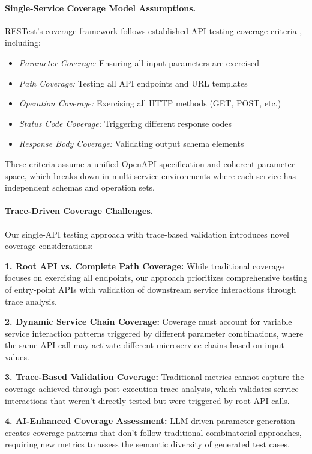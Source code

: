 \documentclass[conference]{IEEEtran}
\begin{document}
\paragraph{Single-Service Coverage Model Assumptions.}
RESTest's coverage framework follows established API testing coverage criteria \cite{martin2019restest}, including:
\begin{itemize}[leftmargin=*]
    \item \textit{Parameter Coverage:} Ensuring all input parameters are exercised
    \item \textit{Path Coverage:} Testing all API endpoints and URL templates  
    \item \textit{Operation Coverage:} Exercising all HTTP methods (GET, POST, etc.)
    \item \textit{Status Code Coverage:} Triggering different response codes
    \item \textit{Response Body Coverage:} Validating output schema elements
\end{itemize}

These criteria assume a unified OpenAPI specification and coherent parameter space, which breaks down in multi-service environments where each service has independent schemas and operation sets.

\paragraph{Trace-Driven Coverage Challenges.}
Our single-API testing approach with trace-based validation introduces novel coverage considerations:

\textbf{1. Root API vs. Complete Path Coverage:} While traditional coverage focuses on exercising all endpoints, our approach prioritizes comprehensive testing of entry-point APIs with validation of downstream service interactions through trace analysis.

\textbf{2. Dynamic Service Chain Coverage:} Coverage must account for variable service interaction patterns triggered by different parameter combinations, where the same API call may activate different microservice chains based on input values.

\textbf{3. Trace-Based Validation Coverage:} Traditional metrics cannot capture the coverage achieved through post-execution trace analysis, which validates service interactions that weren't directly tested but were triggered by root API calls.

\textbf{4. AI-Enhanced Coverage Assessment:} LLM-driven parameter generation creates coverage patterns that don't follow traditional combinatorial approaches, requiring new metrics to assess the semantic diversity of generated test cases.
\end{document}
